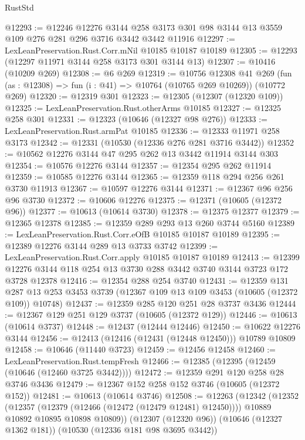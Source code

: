\begin{lexlean}{RustStd}
\begin{coremodule}
@12293 := @12246
    @12276
    @3144
    @258
    @3173
    @301
    @98
    @3144
    @13
    @3559
    @109
    @276
    @281
    @296
    @3716
    @3442
    @3442
    @11916
@12297 := LexLeanPreservation.Rust.Corr.mNil @10185 @10187 @10189
@12305 := @12293 (@12297 @11971 @3144 @258 @3173 @301 @3144 @13)
@12307 := @10416 (@10209 @269)
@12308 := @6 @269
@12319 := @10756
    @12308
    @41
    @269
    (fun (as : @12308) => fun (i : @41) => @10764 (@10765 @269 @10269))
    (@10772 @269)
@12320 := @12319 @301
@12323 := @12305 (@12307 (@12320 @109))
@12325 := LexLeanPreservation.Rust.otherArms @10185
@12327 := @12325 @258 @301
@12331 := @12323 (@10646 (@12327 @98 @276))
@12333 := LexLeanPreservation.Rust.armPat @10185
@12336 := @12333 @11971 @258 @3173
@12342 := @12331 (@10530 (@12336 @276 @281 @3716 @3442))
@12352 := @10562 @12276 @3144 @47 @295 @262 @13 @3442 @11914 @3144 @303
@12354 := @10576 @12276 @3144
@12357 := @12354 @295 @262 @11914
@12359 := @10585 @12276 @3144
@12365 := @12359 @118 @294 @256 @261 @3730 @11913
@12367 := @10597 @12276 @3144
@12371 := @12367 @96 @256 @96 @3730
@12372 := @10606 @12276
@12375 := @12371 (@10605 (@12372 @96))
@12377 := @10613 (@10614 @3730)
@12378 := @12375 @12377
@12379 := @12365 @12378
@12385 := @12359 @289 @293 @13 @260 @3744 @5160
@12389 := LexLeanPreservation.Rust.Corr.eOfB @10185 @10187 @10189
@12395 := @12389 @12276 @3144 @289 @13 @3733 @3742
@12399 := LexLeanPreservation.Rust.Corr.apply @10185 @10187 @10189
@12413 := @12399 @12276 @3144 @118 @254 @13 @3730 @288 @3442 @3740 @3144 @3723 @172 @3728 @12378
@12416 := @12354 @288 @254 @3740
@12431 := @12359
    @131
    @287
    @13
    @253
    @3453
    @3739
    (@12367 @109 @13 @109 @3453 (@10605 (@12372 @109)) @10748)
@12437 := @12359 @285 @120 @251 @28 @3737 @3436
@12444 := @12367 @129 @251 @129 @3737 (@10605 (@12372 @129))
@12446 := @10613 (@10614 @3737)
@12448 := @12437 (@12444 @12446)
@12450 := @10622 @12276 @3144
@12456 := @12413 (@12416 (@12431 (@12448 @12450))) @10789 @10809
@12458 := @10646 (@11440 @3723)
@12459 := @12456 @12458
@12460 := LexLeanPreservation.Rust.tempFresh
@12466 := @12385 (@12395 (@12459 (@10646 (@12460 @3725 @3442))))
@12472 := @12359 @291 @120 @258 @28 @3746 @3436
@12479 := @12367 @152 @258 @152 @3746 (@10605 (@12372 @152))
@12481 := @10613 (@10614 @3746)
@12508 := @12263
    (@12342
      (@12352
        (@12357 (@12379 (@12466 (@12472 (@12479 @12481) @12450))))
        @10889
        @10892
        @10895
        @10898
        @10809))
    (@12307 (@12320 @96))
    (@10646 (@12327 @1362 @181))
    (@10530 (@12336 @181 @98 @3695 @3442))

\end{coremodule}
\end{lexlean}
